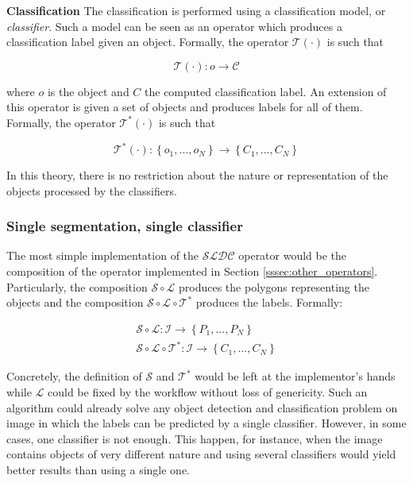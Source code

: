 \begin{definition}\textbf{Classification} The classification is performed using a classification model, or \textit{classifier}. Such a model can be seen as an operator which produces a classification label given an object. Formally, the operator $\mathcal{T}(\cdot)$ is such that 

\begin{equation}
	\mathcal{T}(\cdot) : o \rightarrow \mathcal{C}	
\end{equation}

where $o$ is the object and $C$ the computed classification label. An extension of this operator is given a set of objects and produces labels for all of them. Formally, the operator $\mathcal{T}^*(\cdot)$ is such that 

\begin{equation}
	\mathcal{T}^*(\cdot) : \left\{o_1, ..., o_N\right\}  \rightarrow \left\{C_1, ..., C_N\right\}
\end{equation}

In this theory, there is no restriction about the nature or representation of the objects processed by the classifiers.
\end{definition}

\subsubsection{Single segmentation, single classifier}
\label{sssec:single_single}

The most simple implementation of the $\mathcal{SLDC}$ operator would be the composition of the operator implemented in Section \ref{sssec:other_operators}. Particularly, the composition $\mathcal{S} \circ \mathcal{L}$ produces the polygons representing the objects and the composition $\mathcal{S} \circ \mathcal{L} \circ \mathcal{T}^*$ produces the labels. Formally: 

\begin{eqnarray}
	\label{eqn:segment_locate_base} \mathcal{S} \circ \mathcal{L} : \mathcal{I} \rightarrow \left\{P_1, ..., P_N\right\} \\
	\mathcal{S} \circ \mathcal{L} \circ \mathcal{T}^* : \mathcal{I} \rightarrow \left\{C_1, ..., C_N\right\}
\end{eqnarray}

Concretely, the definition of $\mathcal{S}$ and $\mathcal{T}^*$ would be left at the implementor's hands while $\mathcal{L}$ could be fixed by the workflow without loss of genericity. Such an algorithm could already solve any object detection and classification problem on image in which the labels can be predicted by a single classifier. However, in some cases, one classifier is not enough. This happen, for instance, when the image contains objects of very different nature and using several classifiers would yield better results than using a single one.

